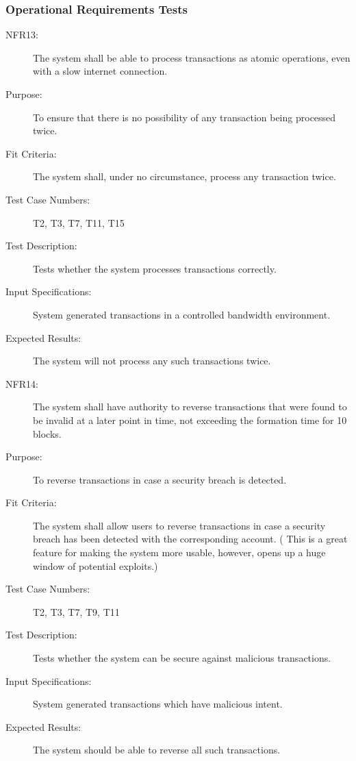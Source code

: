 \documentclass[a4paper,twoside,phd]{BYUPhys}
\begin{document}
\subsubsection{Operational Requirements Tests}
\begin{description}
\item[NFR13:] The  system  shall  be  able  to  process  transactions  as  atomic  operations, even with a slow internet connection.
\item[Purpose:] To ensure that there is no possibility of any transaction being processed twice.
\item[Fit Criteria:] The system shall, under no circumstance, process any transaction twice.
\item[Test Case Numbers:] T2, T3, T7, T11, T15
\item[Test Description:] Tests whether the system processes transactions correctly.
\item[Input Specifications:] System generated transactions in a controlled bandwidth environment.
\item[Expected Results:] The system will not process any such transactions twice.

\item[NFR14:] The system shall have authority to reverse transactions that were found to be invalid at a later point in time, not exceeding the formation time for 10 blocks.
\item[Purpose:] To reverse transactions in case a security breach is detected.
\item[Fit Criteria:] The system shall allow users to reverse transactions in case a security breach has been detected with the corresponding account. ( This is a great feature for making the system more usable, however, opens up a huge window of potential exploits.)
\item[Test Case Numbers:] T2, T3, T7, T9, T11
\item[Test Description:] Tests whether the system can be secure against malicious transactions.
\item[Input Specifications:] System generated transactions which have malicious intent.
\item[Expected Results:] The system should be able to reverse all such transactions.


\end{description}
\end{document}
